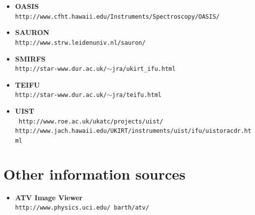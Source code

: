 \documentclass[twoside,11pt]{article}
\newcommand{\htmladdnormallink}[2]{#1}
\newcommand{\xlabel}[1]{}
\begin{document}
\begin{\htmlonly}
{\begin{small}
\begin{itemize}
\item {\bf\label{sc16_available_oasis}OASIS}\\
\htmladdnormallink{{\tt http://www.cfht.hawaii.edu/Instruments/Spectroscopy/OASIS/}}{http://www.cfht.hawaii.edu/Instruments/Spectroscopy/OASIS/}

\item {\bf\label{sc16_available_sauron}SAURON}\\
\htmladdnormallink{{\tt http://www.strw.leidenuniv.nl/sauron/}}{http://www.strw.leidenuniv.nl/sauron/}

\item {\bf\label{sc16_available_smirfs}SMIRFS}\\
\htmladdnormallink{{\tt http://star-www.dur.ac.uk/$\sim$jra/ukirt\_ifu.html}}{http://star-www.dur.ac.uk/~jra/ukirt_ifu.html}

\item {\bf\label{sc16_available_teifu}TEIFU}\\
\htmladdnormallink{{\tt http://star-www.dur.ac.uk/$\sim$jra/teifu.html}}{http://star-www.dur.ac.uk/~jra/teifu.html}

\item {\bf\label{sc16_available_uist}UIST}\\
\htmladdnormallink{{\tt
http://www.roe.ac.uk/ukatc/projects/uist/}}{http://www.roe.ac.uk/ukatc/projects/uist/}\\
\htmladdnormallink{{\tt http://www.jach.hawaii.edu/UKIRT/instruments/uist/ifu/uistoracdr.html}}{http://www.jach.hawaii.edu/UKIRT/instruments/uist/ifu/uistoracdr.html}

\end{itemize}
\end{small}

\section{\xlabel{sc16_sources}Other information sources\label{sc16_sources}}

\begin{small}
\begin{itemize}


\item {\bf\label{sc16_sources_atv}ATV Image Viewer}\\
\htmladdnormallink{{\tt http://www.physics.uci.edu/~barth/atv/}}{http://www.physics.uci.edu/~barth/atv/}


\end{itemize}
\end{small}}
\end{\htmlonly}
\end{document}
